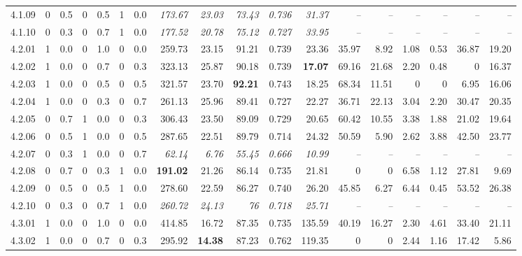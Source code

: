 \begin{table}[!t]
\begin{tabular}{@{}lllllllrrrrrrrrrrr@{}}
    4.1.09 & 0 & 0.5 & 0 & 0.5 & 1 & 0.0 & \textit{173.67} & \textit{23.03} & \textit{73.43} & \textit{0.736} & \textit{31.37} & \textit{--} & \textit{--} & \textit{--} & \textit{--} & \textit{--} & \textit{--} \\
    4.1.10 & 0 & 0.3 & 0 & 0.7 & 1 & 0.0 & \textit{177.52} & \textit{20.78} & \textit{75.12} & \textit{0.727} & \textit{33.95} & \textit{--} & \textit{--} & \textit{--} & \textit{--} & \textit{--} & \textit{--} \\
    4.2.01 & 1 & 0.0 & 0 & 1.0 & 0 & 0.0 & 259.73 & 23.15 & 91.21 & 0.739 & 23.36 & 35.97 & 8.92 & 1.08 & 0.53 & 36.87 & 19.20 \\
    4.2.02 & 1 & 0.0 & 0 & 0.7 & 0 & 0.3 & 323.13 & 25.87 & 90.18 & 0.739 & \textbf{17.07} & 69.16 & 21.68 & 2.20 & 0.48 & 0 & 16.37 \\
    4.2.03 & 1 & 0.0 & 0 & 0.5 & 0 & 0.5 & 321.57 & 23.70 & \textbf{92.21} & 0.743 & 18.25 & 68.34 & 11.51 & 0 & 0 & 6.95 & 16.06 \\
    4.2.04 & 1 & 0.0 & 0 & 0.3 & 0 & 0.7 & 261.13 & 25.96 & 89.41 & 0.727 & 22.27 & 36.71 & 22.13 & 3.04 & 2.20 & 30.47 & 20.35 \\
    4.2.05 & 0 & 0.7 & 1 & 0.0 & 0 & 0.3 & 306.43 & 23.50 & 89.09 & 0.729 & 20.65 & 60.42 & 10.55 & 3.38 & 1.88 & 21.02 & 19.64 \\
    4.2.06 & 0 & 0.5 & 1 & 0.0 & 0 & 0.5 & 287.65 & 22.51 & 89.79 & 0.714 & 24.32 & 50.59 & 5.90 & 2.62 & 3.88 & 42.50 & 23.77 \\
    4.2.07 & 0 & 0.3 & 1 & 0.0 & 0 & 0.7 & \textit{62.14} & \textit{6.76} & \textit{55.45} & \textit{0.666} & \textit{10.99} & \textit{--} & \textit{--} & \textit{--} & \textit{--} & \textit{--} & \textit{--} \\
    4.2.08 & 0 & 0.7 & 0 & 0.3 & 1 & 0.0 & \textbf{191.02} & 21.26 & 86.14 & 0.735 & 21.81 & 0 & 0 & 6.58 & 1.12 & 27.81 & 9.69 \\
    4.2.09 & 0 & 0.5 & 0 & 0.5 & 1 & 0.0 & 278.60 & 22.59 & 86.27 & 0.740 & 26.20 & 45.85 & 6.27 & 6.44 & 0.45 & 53.52 & 26.38 \\
    4.2.10 & 0 & 0.3 & 0 & 0.7 & 1 & 0.0 & \textit{260.72} & \textit{24.13} & \textit{76} & \textit{0.718} & \textit{25.71} & \textit{--} & \textit{--} & \textit{--} & \textit{--} & \textit{--} & \textit{--} \\
    4.3.01 & 1 & 0.0 & 0 & 1.0 & 0 & 0.0 & 414.85 & 16.72 & 87.35 & 0.735 & 135.59 & 40.19 & 16.27 & 2.30 & 4.61 & 33.40 & 21.11 \\
    4.3.02 & 1 & 0.0 & 0 & 0.7 & 0 & 0.3 & 295.92 & \textbf{14.38} & 87.23 & 0.762 & 119.35 & 0 & 0 & 2.44 & 1.16 & 17.42 & 5.86 \\

\end{tabular}
\end{table}
